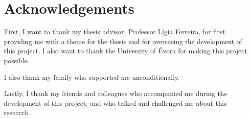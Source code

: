 \chapter*{Acknowledgements}

First, I want to thank my thesis advisor, Professor Lígia Ferreira, for first
providing me with a theme for the thesis and for overseeing the development of
this project. I also want to thank the University of Évora for making this
project possible.

I also thank my family who supported me unconditionally.

Lastly, I thank my friends and colleagues who accompanied me during the
development of this project, and who talked and challenged me about this
research.
